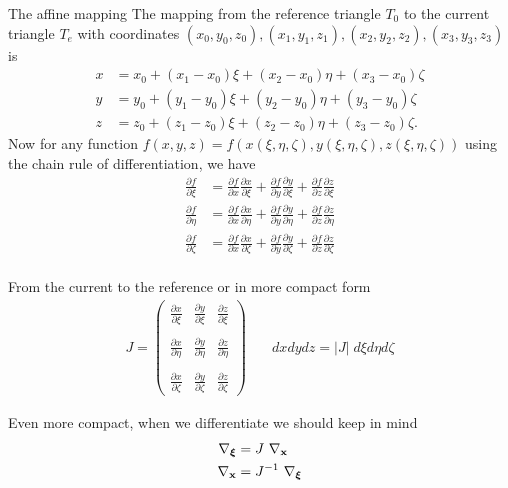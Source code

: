 \documentclass[handout]{beamer}
{
\usepackage{fullpage}
\usepackage{hyperref}
\usepackage{amssymb} 
}
\newcommand{\pmat}[1]{\begin{pmatrix}#1\end{pmatrix}}
\newcommand{\pder}[2]{\frac{\partial #1}{\partial #2}}
\begin{document}
\begin{frame}{The affine mapping}
The mapping from the reference triangle $T_0$ to the current
triangle $T_e$ with coordinates $(x_0,y_0,z_0),(x_1,y_1,z_1),(x_2,y_2,z_2),(x_3,y_3,z_3)$ is 
\begin{align*}
x   &= x_0 + (x_1 - x_0) \xi + (x_2 - x_0) \eta  + (x_3 - x_0) \zeta \\
y   &= y_0 + (y_1 - y_0) \xi + (y_2 - y_0) \eta  + (y_3 - y_0) \zeta \\
z   &= z_0 + (z_1 - z_0) \xi + (z_2 - z_0) \eta  + (z_3 - z_0) \zeta. 
\end{align*}
Now for any function $f(x,y,z)=f(x(\xi, \eta, \zeta),y(\xi, \eta, \zeta),z(\xi, \eta, \zeta))$ using the 
chain rule of differentiation, we have
\begin{align*}
\pder{f}{\xi}   &= \pder{f}{x}\pder{x}{\xi} + \pder{f}{y}\pder{y}{\xi} + \pder{f}{z}\pder{z}{\xi}\\
\pder{f}{\eta}  &= \pder{f}{x}\pder{x}{\eta} + \pder{f}{y}\pder{y}{\eta} + \pder{f}{z}\pder{z}{\eta} \\
\pder{f}{\zeta}  &= \pder{f}{x}\pder{x}{\zeta} + \pder{f}{y}\pder{y}{\zeta} + \pder{f}{z}\pder{z}{\zeta} \\
\end{align*}

\end{frame}

\begin{frame}{From the current to the reference}
or in more compact form
\begin{align*}
J=
\pmat{ \pder{x}{\xi}  & \pder{y}{\xi} & \pder{z}{\xi}\\ \\
       \pder{x}{\eta} & \pder{y}{\eta} & \pder{z}{\eta}\\ \\
       \pder{x}{\zeta} & \pder{y}{\zeta} & \pder{z}{\zeta}
}
& \quad
dx  dy  dz = |J|\; d\xi  d\eta  d\zeta
\end{align*}

Even more compact, when we differentiate we should keep in mind
\begin{align*}
\nabla_{\boldsymbol \xi} &= J \ \nabla_{\bf x}\\
\nabla_{\bf x} &= J^{-1} \ \nabla_{\boldsymbol \xi}
\end{align*}


\end{frame}
\end{document}
